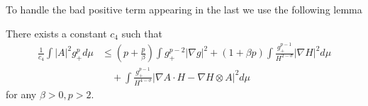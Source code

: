 To handle the bad positive term appearing in the last we use the following lemma
\begin{lemma}
    There exists a constant $ c_{4} $ such that  \begin{align*}
        \frac{1}{c_{4}} \int |A|^{2}g_{+}^{p} d \mu & \le \left( p+ \frac{p}{\beta} \right) \int g_{+}^{p-2}| \nabla g|^{2} + (1+ \beta p)\int \frac{g_{+}^{p-1}}{H^{2-\sigma}}| \nabla H|^{2} d \mu \\
        & \quad + \int \frac{g_{+}^{p-1}}{H^{4-\sigma}}|\nabla A \cdot H - \nabla H \otimes A|^{2} d \mu
    \end{align*}
    for any $ \beta >0 , p>2$.
\end{lemma}
\begin{comment}
    \begin{align*}
    \Delta g & = \Delta  \left(\frac{|A|^{2}}{H^{2}} \right)H^{\sigma} + \left( \frac{|A|^{2}}{H^{2}} - (1+\eta) \right)\Delta H^{\sigma} + 2\left<  \nabla \left( \frac{|A|^{2}}{H^{2}}\right) , \nabla H^{\sigma} \right> \\
    & = \left( \frac{\Delta |A|^{2}}{H^{2}} -|A|^{2} \frac{\Delta H^{2}}{H^{4}} - \frac{2}{H^{4}}\left< \nabla |A|^{2}, \nabla H^{2}  \right>+ \frac{2|A|^{2}}{H^{6}}|\nabla H^{2}|^{2}\right)H^{\sigma} \\
    & \quad + \left( \frac{|A|^{2}}{H^{2}} - (1+\eta) \right)\left( \sigma H^{\sigma -1}\Delta H + \sigma (\sigma -1)H^{\sigma -2}| \nabla H|^{2} \right) \\
    & = \frac{\Delta |A|^{2}}{H^{2-\sigma}} - |A|^{2}\left( \frac{2H \Delta H + |\nabla H|^{2}}{H^{4-\sigma}} \right) - \frac{2}{H^{4-\sigma}}\left( 4H\left< \nabla A, \nabla H \otimes A \right> \right) + 8|A|^{2}\frac{|\nabla H|^{2}}{H^{4-\sigma}} \\
    & \quad 
\end{align*}
\end{comment}
